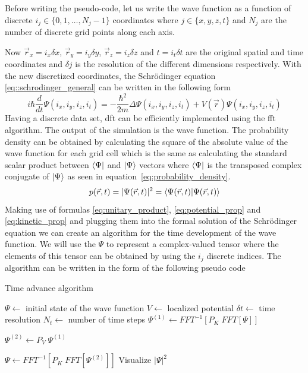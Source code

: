 Before writing the pseudo-code, let us write the wave function as a function of discrete $i_j \in \{0, 1, \dots, N_j - 1\}$ coordinates where $j \in \{x, y, z, t\}$ and $N_j$ are the number of discrete grid points along each axis.

Now $\vec{r}_x = i_x \delta x$, $\vec{r}_y = i_y \delta y$, $\vec{r}_z = i_z \delta z$ and $t = i_t \delta t$ are the original spatial and time coordinates and $\delta j$ is the resolution of the different dimensions respectively.
With the new discretized coordinates, the Schrödinger equation \ref{eq::schrodinger_general} can be written in the following form
\begin{equation}
	\label{eq:discretized_schrodinger}		
	i \hbar \frac{d}{dt}\Psi(i_x, i_y, i_z, i_t) = - \frac{\hbar^2}{2m}\Delta\Psi(i_x, i_y, i_z, i_t) + V(\vec{r})\Psi(i_x, i_y, i_z, i_t)
\end{equation}
Having a discrete data set, \acrfull{dft} can be efficiently implemented using the \acrfull{fft} algorithm.
The output of the simulation is the wave function.
The probability density can be obtained by calculating the square of the absolute value of the wave function for each grid cell which is the same as calculating the standard scalar product between $\bra{\Psi}$ and $\ket{\Psi}$ vectors where $\bra{\Psi}$ is the transposed complex conjugate of $\ket{\Psi}$ as seen in equation~\ref{eq:probability_density}.
\begin{equation}
	\label{eq:probability_density}
	p(\vec{r}, t) = |\Psi(\vec{r}, t)|^2 = \braket{\Psi(\vec{r}, t)}
\end{equation}
Making use of formulas \ref{eq:unitary_product}, \ref{eq:potential_prop} and \ref{eq:kinetic_prop} and plugging them into the formal solution of the Schrödinger equation we can create an algorithm for the time development of the wave function.
We will use the $\Psi$ to represent a complex-valued tensor where the elements of this tensor can be obtained by using the $i_j$ discrete indices.
The algorithm can be written in the form of the following pseudo code
\begin{algorithm}
	\caption{Time advance algorithm}\label{alg:time_advance}
	\begin{algorithmic}
		\State $ \Psi \gets $ initial state of the wave function
		\State $ V \gets $ localized potential
		\State $ \delta t \gets $ time resolution
		\State $ N_t \gets $ number of time steps
		\For{$i \in [0, N_t)$}
		\State $\Psi^{(1)} \gets FFT^{-1}
		\left[
		P_K\; FFT\left[ \Psi \right]
		\right]
		$
		
		\State $\Psi^{(2)} \gets P_V\; \Psi^{(1)}$
		
		\State $\Psi \gets FFT^{-1}
		\left[
		P_K\; FFT\left[ \Psi^{(2)} \right]
		\right]
		$
		\State Visualize $|\Psi|^2$
		\EndFor
	\end{algorithmic}
\end{algorithm}

